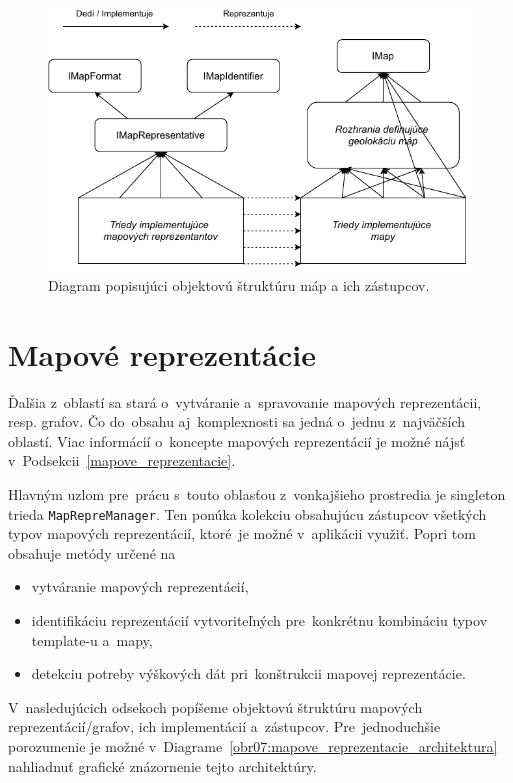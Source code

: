 \begin{figure}[h]\centering
\includegraphics[]{img/mapy_architektura}
\caption{Diagram popisujúci objektovú štruktúru máp a ich zástupcov.} 
\label{obr06:mapy_architektura}
\end{figure}

\section{Mapové reprezentácie}

Ďalšia z~oblastí sa stará o~vytváranie a~spravovanie mapových reprezentácii, resp. grafov. Čo do~obsahu aj~komplexnosti sa jedná o~jednu z~najväčších oblastí. Viac informácií o~koncepte mapových reprezentácií je možné nájsť v~Podsekcii~\ref{mapove_reprezentacie}.

Hlavným uzlom pre~prácu s~touto oblasťou z~vonkajšieho prostredia je singleton trieda \texttt{MapRepreManager}. Ten ponúka kolekciu obsahujúcu zástupcov všetkých typov mapových reprezentácií, ktoré~je možné v~aplikácii využiť. Popri tom obsahuje metódy určené na~
\begin{itemize}
    \item vytváranie mapových reprezentácií,
    \item identifikáciu reprezentácií vytvoriteľných pre~konkrétnu kombináciu typov template-u a~mapy,
    \item detekciu potreby výškových dát pri~konštrukcii mapovej reprezentácie.
\end{itemize}

V~nasledujúcich odsekoch popíšeme objektovú štruktúru mapových reprezentácií/grafov, ich implementácií a~zástupcov. Pre~jednoduchšie porozumenie je možné v~Diagrame~\ref{obr07:mapove_reprezentacie_architektura} nahliadnuť grafické znázornenie tejto architektúry. 

